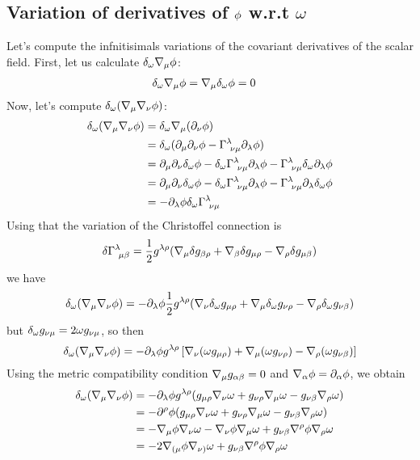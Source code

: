 \subsection{Variation of derivatives of $\phi$ w.r.t $\omega$}
Let's compute the infnitisimals variations of the covariant derivatives of the scalar field. First, let us calculate $\delta_\omega \nabla_\mu \phi $:
\begin{align}
  \delta_\omega\nabla_\mu \phi&=\nabla_\mu \delta_\omega\phi=0 \label{delta-nabla}
\end{align}
Now, let's compute $\delta_\omega (\nabla_\mu \nabla_\nu \phi )$:
\begin{align}
  \delta_\omega (\nabla_\mu \nabla_\nu \phi )&=\delta_\omega \nabla_\mu (\partial_\nu \phi )\\
  &=\delta_\omega(\partial_\mu \partial_\nu \phi -\Gamma^\lambda_{~\nu\mu }\partial_\lambda \phi )\\
  &=\partial_\mu \partial_\nu \delta_\omega\phi -\delta_\omega\Gamma^\lambda_{~\nu\mu }\partial_\lambda\phi -\Gamma^\lambda_{~\nu\mu }\delta_\omega\partial_\lambda\phi \\
  &=\partial_\mu \partial_\nu \delta_\omega\phi -\delta_\omega \Gamma^\lambda_{~\nu\mu }\partial_\lambda\phi -\Gamma^\lambda_{~\nu\mu }\partial_\lambda \delta_\omega \phi \\
  &=-\partial_\lambda\phi \delta_\omega \Gamma^\lambda_{~\nu\mu }
\end{align}
Using that the variation of the Christoffel connection is
\begin{equation}
  \delta \Gamma^\lambda_{~\mu\beta }=\frac{1}{2}g^{\lambda\rho }(\nabla_\mu \delta g_{\beta\rho }+\nabla_\beta \delta g_{\mu\rho }-\nabla_\rho \delta g_{\mu\beta })
\end{equation}
we have
\begin{equation}
  \delta_\omega(\nabla_\mu \nabla_\nu\phi )=-\partial_\lambda\phi \frac{1}{2}g^{\lambda\rho }(\nabla_\nu \delta_\omega g_{\mu\rho }+\nabla_\mu \delta_\omega g_{\nu\rho }-\nabla_\rho\delta_\omega g_{\nu\beta })
\end{equation}
but $\delta_\omega g_{\nu\mu }=2\omega g_{\nu\mu }$, so then
\begin{equation}
   \delta_\omega(\nabla_\mu \nabla_\nu\phi )=-\partial_\lambda\phi g^{\lambda\rho }\left[\nabla_\nu (\omega g_{\mu\rho })+\nabla_\mu (\omega g_{\nu\rho })-\nabla_\rho (\omega g_{\nu\beta })\right]
\end{equation}
Using the metric compatibility condition $\nabla_\mu g_{\alpha\beta }=0$ and $\nabla_\alpha\phi =\partial_\alpha\phi  $, we obtain
\begin{align}
   \delta_\omega(\nabla_\mu \nabla_\nu\phi )&=-\partial_\lambda\phi g^{\lambda\rho }(g_{\mu\rho }\nabla_\nu \omega+g_{\nu\rho }\nabla_\mu \omega-g_{\nu\beta }\nabla_\rho \omega)\\
   &=-\partial^\rho \phi (g_{\mu\rho }\nabla_\nu \omega+g_{\nu\rho }\nabla_\mu \omega-g_{\nu\beta }\nabla_\rho \omega)\\
   &=-\nabla_\mu \phi\nabla_\nu \omega-\nabla_\nu \phi \nabla_\mu \omega +g_{\nu\beta }\nabla^\rho \phi\nabla_\rho\omega\\
   &=-2\nabla_{(\mu }\phi\nabla_{\nu)}\omega+g_{\nu\beta }\nabla^\rho \phi\nabla_\rho\omega \label{delta-nabla-nabla}
\end{align}


